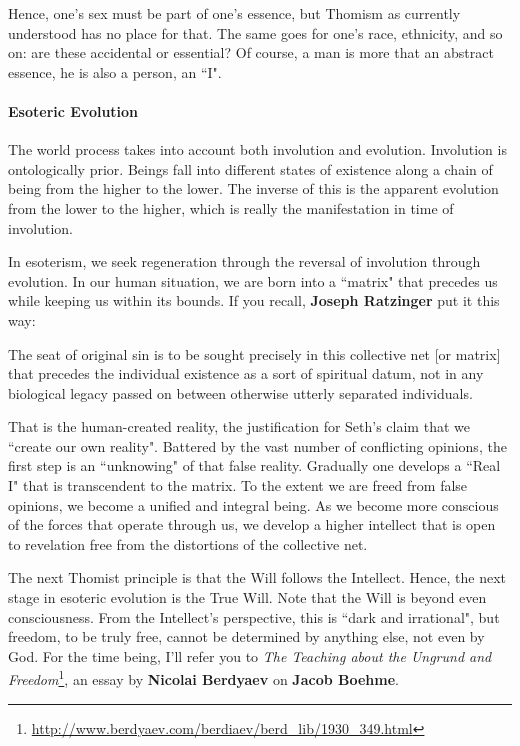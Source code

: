 Hence, one's sex must be part of one's essence, but Thomism as currently understood has no place for that. The same goes for one's race, ethnicity, and so on: are these accidental or essential? Of course, a man is more that an abstract essence, he is also a person, an ``I".

\paragraph{Esoteric Evolution}
The world process takes into account both involution and evolution. Involution is ontologically prior. Beings fall into different states of existence along a chain of being from the higher to the lower. The inverse of this is the apparent evolution from the lower to the higher, which is really the manifestation in time of involution.

In esoterism, we seek regeneration through the reversal of involution through evolution. In our human situation, we are born into a ``matrix" that precedes us while keeping us within its bounds. If you recall, \textbf{Joseph Ratzinger} put it this way:

\begin{quotex}
The seat of original sin is to be sought precisely in this collective net [or matrix] that precedes the individual existence as a sort of spiritual datum, not in any biological legacy passed on between otherwise utterly separated individuals. 

\end{quotex}
That is the human-created reality, the justification for Seth's claim that we ``create our own reality". Battered by the vast number of conflicting opinions, the first step is an ``unknowing" of that false reality. Gradually one develops a ``Real I" that is transcendent to the matrix. To the extent we are freed from false opinions, we become a unified and integral being. As we become more conscious of the forces that operate through us, we develop a higher intellect that is open to revelation free from the distortions of the collective net.

The next Thomist principle is that the Will follows the Intellect. Hence, the next stage in esoteric evolution is the True Will. Note that the Will is beyond even consciousness. From the Intellect's perspective, this is ``dark and irrational", but freedom, to be truly free, cannot be determined by anything else, not even by God. For the time being, I'll refer you to \textit{The Teaching about the Ungrund and Freedom}\footnote{\url{http://www.berdyaev.com/berdiaev/berd_lib/1930_349.html}}, an essay by \textbf{Nicolai Berdyaev} on \textbf{Jacob Boehme}.

